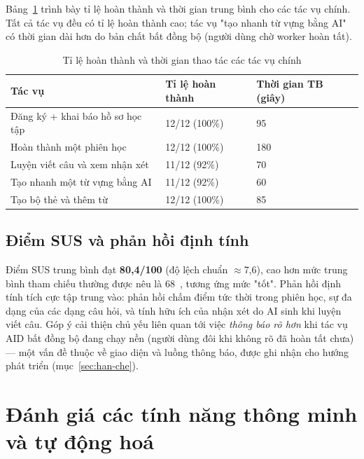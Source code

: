 Bảng~\ref{tab:usability-tasks} trình bày tỉ lệ hoàn thành và thời gian trung
bình cho các tác vụ chính. Tất cả tác vụ đều có tỉ lệ hoàn thành cao; tác vụ
"tạo nhanh từ vựng bằng AI" có thời gian dài hơn do bản chất bất đồng bộ
(người dùng chờ worker hoàn tất).

\begin{table}[h]
  \centering
  \small
  \renewcommand{\arraystretch}{1.3}
  \begin{tabular}{|p{6.0cm}|p{3.4cm}|p{4.0cm}|}
    \hline
    \textbf{Tác vụ} & \textbf{Tỉ lệ hoàn thành} & \textbf{Thời gian TB (giây)} \\
    \hline
    Đăng ký + khai báo hồ sơ học tập & 12/12 (100\%) & 95 \\
    \hline
    Hoàn thành một phiên học & 12/12 (100\%) & 180 \\
    \hline
    Luyện viết câu và xem nhận xét & 11/12 (92\%) & 70 \\
    \hline
    Tạo nhanh một từ vựng bằng AI & 11/12 (92\%) & 60 \\
    \hline
    Tạo bộ thẻ và thêm từ & 12/12 (100\%) & 85 \\
    \hline
  \end{tabular}
  \caption{Tỉ lệ hoàn thành và thời gian thao tác các tác vụ chính}
  \label{tab:usability-tasks}
\end{table}

\subsection{Điểm SUS và phản hồi định tính}
\label{subsec:usability-sus}

Điểm SUS trung bình đạt \textbf{80,4/100} (độ lệch chuẩn $\approx$7,6), cao hơn
mức trung bình tham chiếu thường được nêu là 68~\cite{brooke1996sus}, tương
ứng mức "tốt". Phản hồi định tính tích cực tập trung vào: phản hồi chấm điểm
tức thời trong phiên học, sự đa dạng của các dạng câu hỏi, và tính hữu ích của
nhận xét do AI sinh khi luyện viết câu. Góp ý cải thiện chủ yếu liên quan tới
việc \textit{thông báo rõ hơn} khi tác vụ AID bất đồng bộ đang chạy nền (người
dùng đôi khi không rõ đã hoàn tất chưa) --- một vấn đề thuộc về giao diện và
luồng thông báo, được ghi nhận cho hướng phát triển (mục~\ref{sec:han-che}).

\section{Đánh giá các tính năng thông minh và tự động hoá}
\label{sec:danh-gia-thong-minh}

